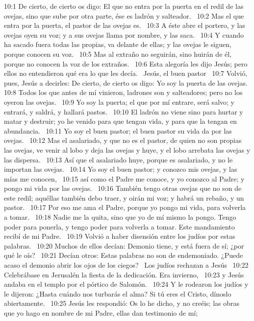 10:1 De cierto, de cierto os digo: El que no entra por la puerta en el redil de las ovejas, sino que sube por otra parte, ése es ladrón y salteador.  
10:2 Mas el que entra por la puerta, el pastor de las ovejas es.  
10:3 A éste abre el portero, y las ovejas oyen su voz; y a sus ovejas llama por nombre, y las saca.  
10:4 Y cuando ha sacado fuera todas las propias, va delante de ellas; y las ovejas le siguen, porque conocen su voz.  
10:5 Mas al extraño no seguirán, sino huirán de él, porque no conocen la voz de los extraños.  
10:6 Esta alegoría les dijo Jesús; pero ellos no entendieron qué era lo que les decía.  
Jesús, el buen pastor  
10:7 Volvió, pues, Jesús a decirles: De cierto, de cierto os digo: Yo soy la puerta de las ovejas. 
10:8 Todos los que antes de mí vinieron, ladrones son y salteadores; pero no los oyeron las ovejas.  
10:9 Yo soy la puerta; el que por mí entrare, será salvo; y entrará, y saldrá, y hallará pastos.  
10:10 El ladrón no viene sino para hurtar y matar y destruir; yo he venido para que tengan vida, y para que la tengan en abundancia.  
10:11 Yo soy el buen pastor; el buen pastor su vida da por las ovejas.  
10:12 Mas el asalariado, y que no es el pastor, de quien no son propias las ovejas, ve venir al lobo y deja las ovejas y huye, y el lobo arrebata las ovejas y las dispersa.  
10:13 Así que el asalariado huye, porque es asalariado, y no le importan las ovejas.  
10:14 Yo soy el buen pastor; y conozco mis ovejas, y las mías me conocen,  
10:15 así como el Padre me conoce, y yo conozco al Padre; y pongo mi vida por las ovejas.  
10:16 También tengo otras ovejas que no son de este redil; aquéllas también debo traer, y oirán mi voz; y habrá un rebaño, y un pastor.  
10:17 Por eso me ama el Padre, porque yo pongo mi vida, para volverla a tomar.  
10:18 Nadie me la quita, sino que yo de mí mismo la pongo. Tengo poder para ponerla, y tengo poder para volverla a tomar. Este mandamiento recibí de mi Padre.  
10:19 Volvió a haber disensión entre los judíos por estas palabras.  
10:20 Muchos de ellos decían: Demonio tiene, y está fuera de sí; ¿por qué le oís?  
10:21 Decían otros: Estas palabras no son de endemoniado. ¿Puede acaso el demonio abrir los ojos de los ciegos?  
Los judíos rechazan a Jesús  
10:22 Celebrábase en Jerusalén la fiesta de la dedicación. Era invierno,  
10:23 y Jesús andaba en el templo por el pórtico de Salomón.  
10:24 Y le rodearon los judíos y le dijeron: ¿Hasta cuándo nos turbarás el alma? Si tú eres el Cristo, dínoslo abiertamente.  
10:25 Jesús les respondió: Os lo he dicho, y no creéis; las obras que yo hago en nombre de mi Padre, ellas dan testimonio de mí;  
